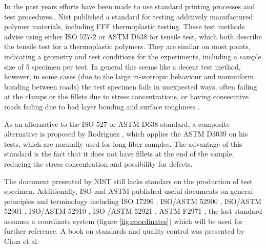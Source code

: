 In the past years efforts have been made to use standard printing processes and test procedures.. Nist \cite{Forster2015NISTApplicability} published a standard for testing additively manufactured polymer materials, including FFF thermoplastic testing. These test methods advise using either ISO 527-2 \cite{Afd2016NEN-EN-ISO527-2} or ASTM D638 \cite{Materials2015ASTMD638-14} for tensile test, which both describe the tensile test for a thermoplastic polymers. They are similar on most points, indicating a geometry and test conditions for the experiments, including a sample size of 5 specimen per test. In general this seems like a decent test method, however, in some cases (due to the large in-isotropic behaviour and nonuniform bonding between roads) the test specimen fails in unexpected ways, often failing at the clamps or the fillets due to stress concentrations\cite{Alaimo2017InfluenceParts}, or having consecutive roads failing due to bad layer bonding and surface roughness \cite{Ahn2002AnisotropicABS} \cite{Bertoldi1998MechanicalDeposition}. 

As an alternative to the ISO 527 or ASTM D638 standard, a composite alternative is proposed by Rodriguez \cite{Rodriguez2001MechanicalInvestigation}, which applies the ASTM D3039 on his tests, which are normally used for long fiber samples. The advantage of this standard is the fact that it does not have fillets at the end of the sample, reducing the stress concentration and possibility for defects.

The document presented by NIST \cite{Forster2015NISTApplicability} still lacks standars on the production of test specimen. Additionally, ISO and ASTM published useful documents on general principles and terminology including ISO 17296  \cite{Afd2014NEN-EN-ISO179-1}, ISO/ASTM 52900 \cite{ASTMInternational2017ISOParts}, ISO/ASTM 52901 \cite{2019NEN-EN-ISOParts}, ISO/ASTM 52910  \cite{ASTMInternational2017ISOParts}, ISO /ASTM 52921 \cite{NEN_EN_ISO2019NEN_EN_ISOTestmethoden}, ASTM F2971 \cite{2013ASTMManufacturing}, the last standard assumes a coordinate system (figure \ref{fig:coordinates}) which will be used for further reference. A book on standards and quality control was presented by Chua et al. \cite{ChuaStandardManufacturing}


